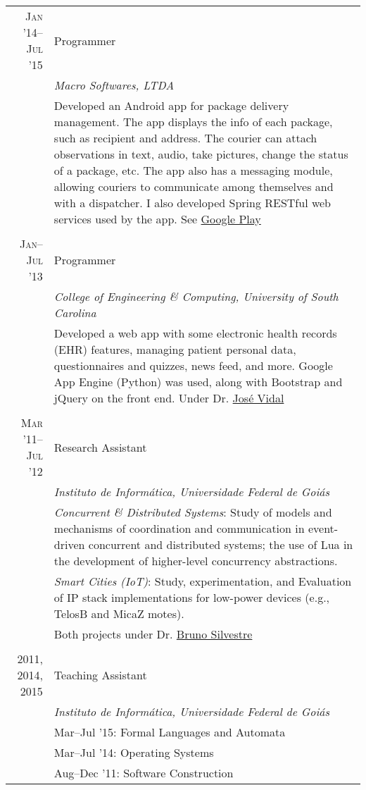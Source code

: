 \documentclass[a4paper,10pt]{article}
\begin{document}
\begin{longtable}{r|p{11cm}}
  \textsc{Jan '14--Jul '15}
  & Programmer \\
  &\emph{Macro Softwares, LTDA}\\
  &\footnotesize{Developed an Android app for package delivery management. The
  app displays the info of each package, such as recipient and address.
  The courier can attach observations in text, audio, take pictures,
  change the status of a package, etc. The app also has a messaging module,
  allowing couriers to communicate among themselves and with a dispatcher. 
  I also developed Spring RESTful web services used by the app. See 
  \href{https://play.google.com/store/apps/details?id=br.com.entregadoronline}{Google Play}} \\
  \multicolumn{2}{c}{} \\

  \textsc{Jan--Jul '13}
  & Programmer \\
  &\emph{College of Engineering \& Computing, University of South Carolina}\\
  &\footnotesize{Developed a web app with some electronic health records (EHR)
  features, managing patient personal data, questionnaires and quizzes, news feed, 
  and more. Google App Engine (Python) was used, along with Bootstrap and jQuery
  on the front end. Under Dr. \href{http://jmvidal.cse.sc.edu}{José Vidal}}\\
  \multicolumn{2}{c}{} \\

  \textsc{Mar '11--Jul '12}
  & Research Assistant \\
  &\emph{Instituto de Informática, Universidade Federal de Goiás}\\
  &\footnotesize{\emph{Concurrent \& Distributed Systems}: Study of models and
  mechanisms of coordination and communication in event-driven concurrent and 
  distributed systems; the use of Lua in the development of higher-level
  concurrency abstractions.}\\
  &\footnotesize{\emph{Smart Cities (IoT)}: Study, experimentation, and Evaluation 
  of IP stack implementations for low-power devices (e.g., TelosB and MicaZ motes).}\\
  &\footnotesize{Both projects under 
    Dr. \href{http://inf.ufg.br/~brunoos/}{Bruno Silvestre}}\\
  \multicolumn{2}{c}{} \\

  \textsc{2011, 2014, 2015}
  & Teaching Assistant \\
  &\emph{Instituto de Informática, Universidade Federal de Goiás} \\
  &\footnotesize{Mar--Jul '15: Formal Languages and Automata} \\
  &\footnotesize{Mar--Jul '14: Operating Systems} \\
  &\footnotesize{Aug--Dec '11: Software Construction}
\end{longtable}
\end{document}
